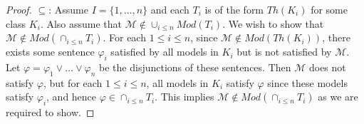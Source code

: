 \documentclass{article}
\begin{document}
\begin{enumerate}
\begin{enumerate}
\begin{proof}
          $\subseteq$: Assume $I=\{1,\ldots,n\}$ and each $T_i$ is of the
          form $Th(K_i)$ for some class $K_i$. Also assume that
          $\mathcal{M}\not\in\cup_{i\leq n}Mod(T_i)$. We wish to show that
          $\mathcal{M}\not\in Mod(\cap_{i\leq n}T_i)$. For each $1\leq
          i\leq n$, since $\mathcal{M}\not\in Mod(Th(K_i))$, there exists some
          sentence $\varphi_i$ satisfied by all models in $K_i$ but is not
          satisfied by $\mathcal{M}$. Let
          $\varphi=\varphi_1\vee\ldots\vee\varphi_n$ be the disjunctions
          of these sentences. Then $\mathcal{M}$ does not satisfy
          $\varphi$, but for each $1\leq i\leq n$, all models in $K_i$
          satisfy $\varphi$ since these models satisfy $\varphi_i$, and
          hence $\varphi\in\cap_{i\leq n}T_i$. This implies
          $\mathcal{M}\not\in Mod(\cap_{i\leq n}T_i)$ as we are required to
          show.
        \end{proof}
    \end{enumerate}
\end{enumerate}
\end{document}
